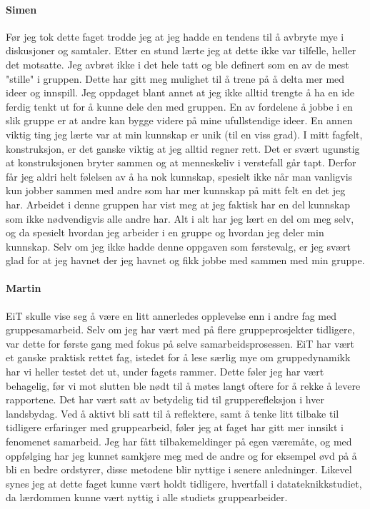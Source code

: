 \paragraph{Simen}
Før jeg tok dette faget trodde jeg at jeg hadde en tendens til å avbryte mye i diskusjoner og samtaler.
Etter en stund lærte jeg at dette ikke var tilfelle, heller det motsatte.
Jeg avbrøt ikke i det hele tatt og ble definert som en av de mest "stille" i gruppen.
Dette har gitt meg mulighet til å trene på å delta mer med ideer og innspill.
Jeg oppdaget blant annet at jeg ikke alltid trengte å ha en ide ferdig tenkt ut for å kunne dele den med gruppen.
En av fordelene å jobbe i en slik gruppe er at andre kan bygge videre på mine ufullstendige ideer.
En annen viktig ting jeg lærte var at min kunnskap er unik (til en viss grad).
I mitt fagfelt, konstruksjon, er det ganske viktig at jeg alltid regner rett.
Det er svært ugunstig at konstruksjonen bryter sammen og at menneskeliv i verstefall går tapt.
Derfor får jeg aldri helt følelsen av å ha nok kunnskap, spesielt ikke når man vanligvis kun jobber sammen med andre som har mer kunnskap på mitt felt en det jeg har.
Arbeidet i denne gruppen har vist meg at jeg faktisk har en del kunnskap som ikke nødvendigvis alle andre har.
Alt i alt har jeg lært en del om meg selv, og da spesielt hvordan jeg arbeider i en gruppe og hvordan jeg deler min kunnskap.
Selv om jeg ikke hadde denne oppgaven som førstevalg, er jeg svært glad for at jeg havnet der jeg havnet og fikk jobbe med sammen med min gruppe.
 
\paragraph{Martin}
EiT skulle vise seg å være en litt annerledes opplevelse enn i andre fag med gruppesamarbeid.
Selv om jeg har vært med på flere gruppeprosjekter tidligere, var dette for første gang med fokus på selve samarbeidsprosessen.
EiT har vært et ganske praktisk rettet fag, istedet for å lese særlig mye om gruppedynamikk har vi heller testet det ut, under fagets rammer.
Dette føler jeg har vært behagelig, før vi mot slutten ble nødt til å møtes langt oftere for å rekke å levere rapportene.
Det har vært satt av betydelig tid til grupperefleksjon i hver landsbydag.
Ved å aktivt bli satt til å reflektere, samt å tenke litt tilbake til tidligere erfaringer med gruppearbeid, føler jeg at faget har gitt mer innsikt i fenomenet samarbeid.
Jeg har fått tilbakemeldinger på egen væremåte, og med oppfølging har jeg kunnet samkjøre meg med de andre og for eksempel øvd på å bli en bedre ordstyrer, disse metodene blir nyttige i senere anledninger.
Likevel synes jeg at dette faget kunne vært holdt tidligere, hvertfall i datateknikkstudiet, da lærdommen kunne vært nyttig i alle studiets gruppearbeider.